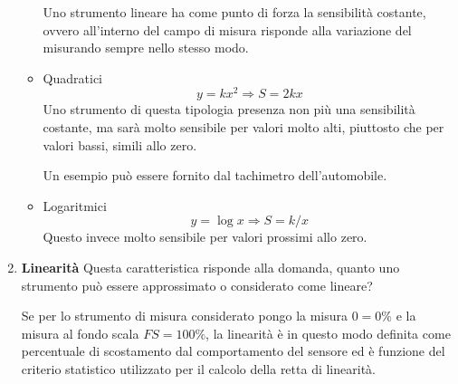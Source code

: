 \documentclass[a4paper, 15pt]{article}
\begin{document}
\begin{adjustwidth}{2in}{}
\begin{enumerate}
\begin{itemize}
		Uno strumento lineare ha come punto di forza la sensibilità costante, ovvero all'interno del campo di misura risponde alla variazione del misurando sempre nello stesso modo.
		
		\item Quadratici 
		\[y = kx^2 \Rightarrow S = 2kx\]
		Uno strumento di questa tipologia presenza non più una sensibilità costante, ma sarà molto sensibile per valori molto alti, piuttosto che per valori bassi, simili allo zero. 
		
		Un esempio può essere fornito dal tachimetro dell'automobile. 
		
		\item Logaritmici
		\[ y = \log x \Rightarrow S = k/x\]
		Questo invece molto sensibile per valori prossimi allo zero. 
	\end{itemize}

\item \textbf{Linearità} \newline
	Questa caratteristica risponde alla domanda, quanto uno strumento può essere approssimato o considerato come lineare? \newline 
	
	Se per lo strumento di misura considerato pongo la misura $0=0\%$ e la misura al fondo scala $FS = 100\%$, la linearità è in questo modo definita come percentuale di scostamento
	dal comportamento del sensore ed è funzione del criterio statistico utilizzato per
	il calcolo della retta di linearità. \newline 
	

\end{enumerate}
\end{adjustwidth}
\end{document}
